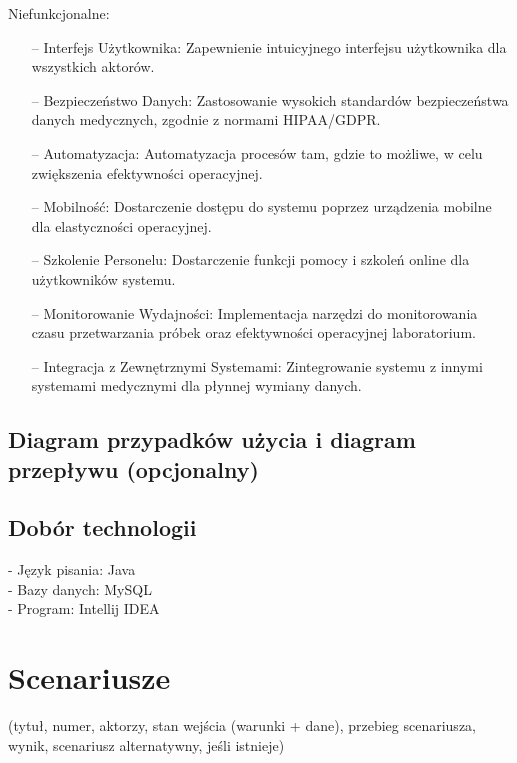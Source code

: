 \documentclass[12pt,a4paper]{article}
\begin{document}
Niefunkcjonalne:
\begin{itemize}

\item[--] Interfejs Użytkownika: Zapewnienie intuicyjnego interfejsu użytkownika dla wszystkich aktorów.
\item[--] Bezpieczeństwo Danych: Zastosowanie wysokich standardów bezpieczeństwa danych medycznych, zgodnie z normami HIPAA/GDPR.
\item[--] Automatyzacja: Automatyzacja procesów tam, gdzie to możliwe, w celu zwiększenia efektywności operacyjnej.
\item[--] Mobilność: Dostarczenie dostępu do systemu poprzez urządzenia mobilne dla elastyczności operacyjnej.
\item[--] Szkolenie Personelu: Dostarczenie funkcji pomocy i szkoleń online dla użytkowników systemu.
\item[--] Monitorowanie Wydajności: Implementacja narzędzi do monitorowania czasu przetwarzania próbek oraz efektywności operacyjnej laboratorium.
\item[--] Integracja z Zewnętrznymi Systemami: Zintegrowanie systemu z innymi systemami medycznymi dla płynnej wymiany danych.

\end{itemize}

\subsection{Diagram przypadków użycia i diagram przepływu (opcjonalny)}

\subsection{Dobór technologii}
- Język pisania: Java \\
- Bazy danych: MySQL \\
- Program: Intellij IDEA \\

\newpage
\section{Scenariusze}
(tytuł, numer, aktorzy, stan wejścia (warunki + dane), przebieg scenariusza, wynik, scenariusz alternatywny, jeśli istnieje)

\newpage
\end{document}
